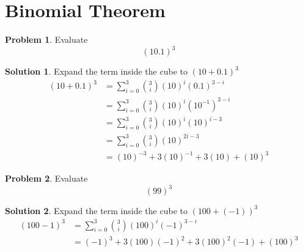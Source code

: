 \documentclass[a4paper]{article}
\theoremstyle{definition}
\newtheorem{problem}{Problem}[section]
\newtheorem*{solution}{Solution}
\begin{document}
\section{Binomial Theorem}
\begin{problem}
Evaluate
\[
(10.1)^3
\]
\end{problem}
\begin{solution}
Expand the term inside the cube to \((10+0.1)^3\)
\begin{align*}
(10+0.1)^3 &= \sum_{i=0}^3 {3 \choose i} (10)^i(0.1)^{3-i} \\
&= \sum_{i=0}^3 {3 \choose i}(10)^i(10^{-1})^{3-i} \\
&= \sum_{i=0}^3 {3 \choose i}(10)^i(10)^{i-3} \\
&= \sum_{i=0}^3 {3 \choose i}(10)^{2i-3} \\
&= (10)^{-3} +3(10)^{-1} + 3(10) + (10)^3
\end{align*}
\end{solution}


\begin{problem}
Evaluate
\[
(99)^3
\]
\end{problem}
\begin{solution}
Expand the term inside the cube to \((100+(-1))^3\)
\begin{align*}
(100-1)^3 &= \sum_{i=0}^3 {3 \choose i} (100)^i(-1)^{3-i} \\
&= (-1)^{3} + 3(100)(-1)^2 + 3(100)^2(-1) + (100)^3
\end{align*}
\end{solution}
\end{document}
